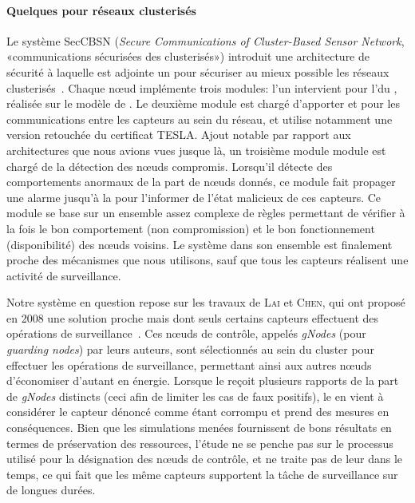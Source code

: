 \paragraph{Quelques \IDS pour réseaux clusterisés}
Le système SecCBSN (\textit{Secure Communications of Cluster-Based Sensor Network}, «communications sécurisées des \rcs clusterisés») introduit une architecture de sécurité à laquelle est adjointe un \ids pour sécuriser au mieux possible les réseaux clusterisés~\cite{HHC07}.
Chaque nœud implémente trois modules: l'un intervient pour l'\election du \ch, réalisée sur le modèle de \leach.
Le deuxième module est chargé d'apporter  et  pour les communications entre les capteurs au sein du réseau, et utilise notamment une version retouchée du certificat TESLA.
Ajout notable par rapport aux architectures que nous avions vues jusque là, un troisième module module est chargé de la détection des nœuds compromis.
Lorsqu'il détecte des comportements anormaux de la part de nœuds donnés, ce module fait propager une alarme jusqu'à la \sdb pour l'informer de l'état malicieux de ces capteurs.
Ce module se base sur un ensemble assez complexe de règles permettant de vérifier à la fois le bon comportement (non compromission) et le bon fonctionnement (disponibilité) des nœuds voisins.
Le système dans son ensemble est finalement proche des mécanismes que nous utilisons, sauf que tous les capteurs réalisent une activité de surveillance.

Notre système en question repose sur les travaux de \textsc{Lai} et \textsc{Chen}, qui ont proposé en 2008 une solution proche mais dont seuls certains capteurs effectuent des opérations de surveillance~\cite{LC08}.
Ces nœuds de contrôle, appelés \textit{gNodes} (pour \textit{guarding nodes}) par leurs auteurs, sont sélectionnés au sein du cluster pour effectuer les opérations de surveillance, permettant ainsi aux autres nœuds d'économiser d'autant en énergie.
Lorsque le \ch reçoit plusieurs rapports de la part de \textit{gNodes} distincts (ceci afin de limiter les cas de faux positifs), le \CH en vient à considérer le capteur dénoncé comme étant corrompu et prend des mesures en conséquences.
Bien que les simulations menées fournissent de bons résultats en termes de préservation des ressources, l'étude ne se penche pas sur le processus utilisé pour la désignation des nœuds de contrôle, et ne traite pas de leur  dans le temps, ce qui fait que les même capteurs supportent la tâche de surveillance sur de longues durées.

